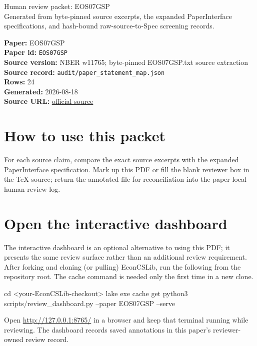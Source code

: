\documentclass[10pt]{article}
\begin{document}
\fontsize{9}{10}\selectfont

\begin{center}
{\LARGE Human review packet: EOS07GSP}\\[0.35em]
\small Generated from byte-pinned source excerpts, the expanded PaperInterface
specifications, and hash-bound raw-source-to-Spec screening records.
\end{center}

\noindent\textbf{Paper:} EOS07GSP\\
\textbf{Paper id:} \texttt{EOS07GSP}\\
\textbf{Source version:} NBER w11765; byte-pinned EOS07GSP.txt source extraction\\
\textbf{Source record:} \texttt{audit/paper\_statement\_map.json}\\
\textbf{Rows:} 24\\
\textbf{Generated:} 2026-08-18\\
\textbf{Source URL:} \href{https://www.nber.org/papers/w11765}{official source}

\noindent{}\par



\section*{How to use this packet}
For each source claim, compare the exact source excerpts with the expanded
PaperInterface specification. Mark up this PDF or fill the blank reviewer box in the TeX source;
return the annotated file for reconciliation into the paper-local human-review
log.

\section*{Open the interactive dashboard}
The interactive dashboard is an optional alternative to using this PDF; it
presents the same review surface rather than an additional review requirement.
After forking and cloning (or pulling) EconCSLib, run the following from the
repository root. The cache command is needed only the first time in a new clone.
\begin{ReviewVerbatim}
cd <your-EconCSLib-checkout>
lake exe cache get
python3 scripts/review_dashboard.py --paper EOS07GSP --serve
\end{ReviewVerbatim}
Open \url{http://127.0.0.1:8765/} in a browser and keep that terminal running
while reviewing. The dashboard records saved annotations in this paper's
reviewer-owned review record.
\end{document}
